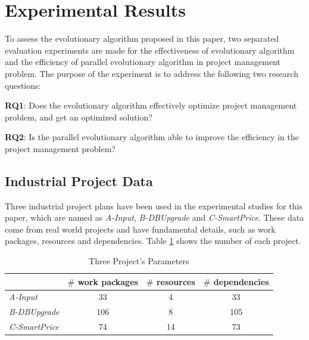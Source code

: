 %
%
\newcommand{\projectA}[0]{\emph{A-Input}}
\newcommand{\projectB}[0]{\emph{B-DBUpgrade}}
\newcommand{\projectC}[0]{\emph{C-SmartPrice}}

  \vspace{-2mm}
\section{Experimental Results}
  \vspace{-2mm}
To assess the evolutionary algorithm proposed in this paper, two separated
evaluation experiments are made for the effectiveness of evolutionary algorithm
and the efficiency of parallel evolutionary algorithm in project management
problem. The purpose of the experiment is to address the following two
research questions:

\textbf{RQ1}: Does the evolutionary algorithm effectively optimize project
management problem, and get an optimized solution?

\textbf{RQ2}: Is the parallel evolutionary algorithm able to improve the
efficiency in the project management problem?

  \vspace{-2mm}
\subsection{Industrial Project Data}
%
Three industrial project plans have been used in the experimental studies for
this paper, which are named as \projectA{}, \projectB{} and \projectC{}. These
data come from real world projects and have fundamental details, such as work
packages, resources and dependencies. Table \ref{tab:statis} shows the number of
each project.

% 
\begin{table}[!h]
\vspace{-6mm}
  \centering
  \caption{Three Project's Parameters}
        \vspace{-2mm}
  \label{tab:statis}
  \begin{tabular}{lccc}
    \hline
      & $\#$ work packages & $\#$ resources & $\#$ dependencies \\
    \hline
    \projectA{} & 33  & 4  & 33  \\
    \projectB{} & 106 & 8  & 105 \\
    \projectC{} & 74  & 14 & 73  \\
    \hline
  \end{tabular}
  \vspace{-6mm}
\end{table}

